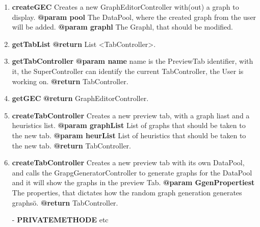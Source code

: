 \begin{enumerate}[+]
{	}
	\item{
	\textbf{createGEC} \newline
	Creates a new GraphEditorController with(out) a graph to display.  \newline
	\textbf{@param pool} The DataPool, where the created graph from the user will be added. \newline
	\textbf{@param graphl} The Graphl, that should be modified. \newline
	}
	\item{
	\textbf{getTabList} \newline
	\textbf{@return} List <TabController>. \newline
	}
	\item{
	\textbf{getTabController} \newline
	\textbf{@param name} name is the PreviewTab identifier, with it, the SuperController can \newline
	identify the current TabController, the User is working on. \newline
	\textbf{@return} TabController. \newline
	}
	\item{
	\textbf{getGEC} \newline
	\textbf{@return} GraphEditorController. \newline
	}
	\item{
	\textbf{createTabController} \newline
	Creates a new preview tab, with a graph liast and a heuristics list.  \newline
	\textbf{@param graphList} List of graphs that should be taken to the new tab. \newline
	\textbf{@param heurList} List of heuristics that should be taken to the new tab. \newline
	\textbf{@return} TabController. \newline
	}
	\item{
	\textbf{createTabController} \newline
	Creates a new preview tab with its own DataPool, and calls the GrapgGeneratorController to generate graphs for the DataPool and it will show the graphs in the preview Tab.  \newline
	\textbf{@param GgenPropertiest} The properties, that dictates how the random graph generation generates graphsö. \newline
	\textbf{@return} TabController. \newline
	}
	\item[-]{
		\textbf{PRIVATEMETHODE} etc
	}
\end{enumerate}

